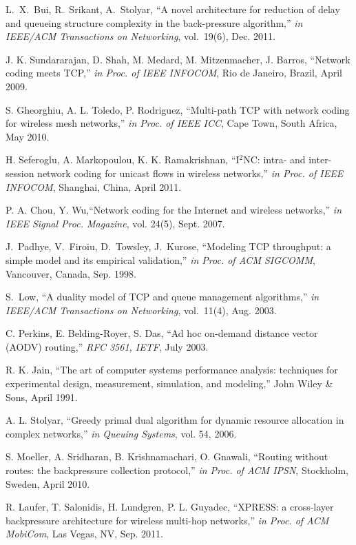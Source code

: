 \documentclass[conference]{IEEEtran}
\begin{document}
\begin{thebibliography}{}
 L.~X.~Bui, R.~Srikant, A.~Stolyar, ``A novel architecture for reduction of delay and queueing structure complexity in the back-pressure algorithm,'' {\em in IEEE/ACM Transactions on Networking}, vol.~19(6), Dec. 2011.

 J. K. Sundararajan, D. Shah, M. Medard, M. Mitzenmacher, J. Barros, ``Network coding meets TCP,'' {\em in Proc. of IEEE INFOCOM}, Rio de Janeiro, Brazil, April 2009.

 	S. Gheorghiu, A. L. Toledo, P. Rodriguez, ``Multi-path TCP with network coding for wireless mesh networks,'' {\em in Proc. of IEEE ICC}, Cape Town, South Africa, May 2010.

 H. Seferoglu, A. Markopoulou, K. K. Ramakrishnan, ``I$^2$NC: intra- and inter-session network coding for unicast flows in wireless networks,'' {\em in Proc. of IEEE INFOCOM}, Shanghai, China, April 2011.

 P. A. Chou, Y. Wu,``Network coding for the Internet and wireless networks,'' {\em in IEEE Signal Proc. Magazine}, vol. 24(5), Sept. 2007.

 J.~Padhye, V.~Firoiu, D.~Towsley, J.~Kurose, ``Modeling TCP throughput: a simple model and its empirical validation,'' {\em in Proc. of ACM SIGCOMM}, Vancouver, Canada, Sep. 1998.

 S.~Low, ``A duality model of TCP and queue management algorithms,'' {\em in IEEE/ACM Transactions on Networking}, vol.~11(4), Aug. 2003.

 C. Perkins, E. Belding-Royer, S. Das, ``Ad hoc on-demand distance vector (AODV) routing,'' {\em RFC 3561, IETF}, July 2003.

 R. K. Jain, ``The art of computer systems performance analysis: techniques for experimental design, measurement, simulation, and modeling,'' John Wiley \& Sons, April 1991.

 A. L. Stolyar, ``Greedy primal dual algorithm for dynamic resource allocation in complex networks,'' {\em in Queuing Systems}, vol. 54, 2006.

 S. Moeller, A. Sridharan, B. Krishnamachari, O. Gnawali, ``Routing without routes: the backpressure collection protocol,'' {\em in Proc. of ACM IPSN}, Stockholm, Sweden, April 2010.

 R. Laufer, T. Salonidis, H. Lundgren, P. L. Guyadec, ``XPRESS: a cross-layer backpressure architecture for wireless multi-hop networks,'' {\em in Proc. of ACM MobiCom}, Las Vegas, NV, Sep. 2011.


\end{thebibliography}
\end{document}
